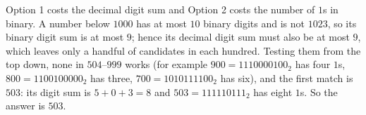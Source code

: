 Option 1 costs the decimal digit sum and Option 2 costs the number of $1$s in binary. A number below $1000$ has at most $10$ binary digits and is not $1023$, so its binary digit sum is at most $9$; hence its decimal digit sum must also be at most $9$, which leaves only a handful of candidates in each hundred. Testing them from the top down, none in $504$--$999$ works (for example $900=1110000100_2$ has four $1$s, $800=1100100000_2$ has three, $700=1010111100_2$ has six), and the first match is $503$: its digit sum is $5+0+3=8$ and $503=111110111_2$ has eight $1$s. So the answer is $\boxed{503}$.
